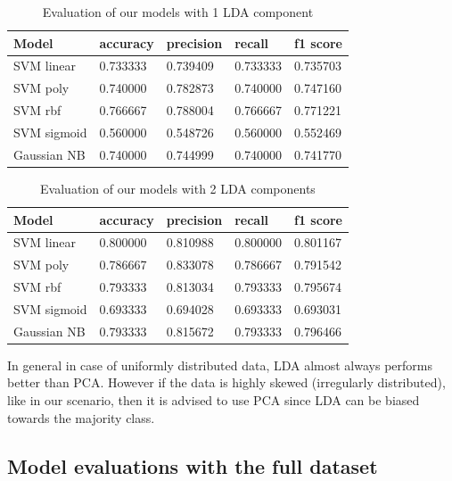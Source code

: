 \documentclass[a4paper,12pt]{article}
\begin{document}
\begin{table}[H]
\begin{tabular}{ |p{6cm}||p{2cm}|p{2cm}|p{2cm}|p{2cm}| }
  \hline
  Model& accuracy & precision  &  recall & f1 score \\
  \hline
  SVM linear           &0.733333&   0.739409&  0.733333&  0.735703\\
  SVM poly             &0.740000&   0.782873&  0.740000&  0.747160\\
  SVM rbf              &0.766667&   0.788004&  0.766667&  0.771221\\
  SVM sigmoid          &0.560000&   0.548726&  0.560000&  0.552469\\
  Gaussian NB          &0.740000&   0.744999&  0.740000&  0.741770\\
  \hline
\end{tabular}
\caption{Evaluation of our models with 1 LDA component}
\label{tab:lda1}
\end{table}

\begin{table}[H]
\begin{tabular}{ |p{6cm}||p{2cm}|p{2cm}|p{2cm}|p{2cm}| }
  \hline
  Model& accuracy & precision  &  recall & f1 score \\
  \hline
  SVM linear           &0.800000&   0.810988&  0.800000&  0.801167\\
  SVM poly             &0.786667&   0.833078&  0.786667&  0.791542\\
  SVM rbf              &0.793333&   0.813034&  0.793333&  0.795674\\
  SVM sigmoid          &0.693333&   0.694028&  0.693333&  0.693031\\
  Gaussian NB          &0.793333&   0.815672&  0.793333&  0.796466\\
  \hline
\end{tabular}
\caption{Evaluation of our models with 2 LDA components}
\label{tab:lda2}
\end{table}


\noindent In general in case of uniformly distributed data, LDA almost always performs better than PCA. However if the data is highly skewed (irregularly distributed), like in our scenario, then it is advised to use PCA since LDA can be biased towards the majority class. \cite{pca-lda}

\newpage
\subsection{Model evaluations with the full dataset}
\end{document}
